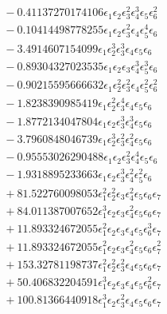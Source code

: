 \documentclass[10pt]{article}
\begin{document}
\begin{align*}
&{}  - 0.41137270174106 \epsilon_{1} \epsilon_{2} \epsilon_{3}^{2} \epsilon_{4}^{3} \epsilon_{5} \epsilon_{6}^{2} \\
&{}  - 0.10414498778255 \epsilon_{1} \epsilon_{2} \epsilon_{3}^{2} \epsilon_{4} \epsilon_{5}^{4} \epsilon_{6} \\
&{}  - 3.4914607154099 \epsilon_{1} \epsilon_{2}^{3} \epsilon_{3}^{3} \epsilon_{4} \epsilon_{5} \epsilon_{6} \\
&{}  - 0.89304327023535 \epsilon_{1} \epsilon_{2} \epsilon_{3} \epsilon_{4}^{3} \epsilon_{5}^{3} \epsilon_{6} \\
&{}  - 0.90215595666632 \epsilon_{1} \epsilon_{2}^{2} \epsilon_{3}^{2} \epsilon_{4} \epsilon_{5}^{2} \epsilon_{6}^{2} \\
&{}  - 1.8238390985419 \epsilon_{1} \epsilon_{2}^{2} \epsilon_{3}^{4} \epsilon_{4} \epsilon_{5} \epsilon_{6} \\
&{}  - 1.8772134047804 \epsilon_{1} \epsilon_{2} \epsilon_{3}^{3} \epsilon_{4}^{3} \epsilon_{5} \epsilon_{6} \\
&{}  - 3.7960848046739 \epsilon_{1} \epsilon_{2}^{3} \epsilon_{3}^{2} \epsilon_{4}^{2} \epsilon_{5} \epsilon_{6} \\
&{}  - 0.95553026290488 \epsilon_{1} \epsilon_{2} \epsilon_{3}^{2} \epsilon_{4}^{4} \epsilon_{5} \epsilon_{6} \\
&{}  - 1.9318895233663 \epsilon_{1} \epsilon_{2} \epsilon_{3}^{3} \epsilon_{4}^{2} \epsilon_{5}^{2} \epsilon_{6} \\
&{}  + 81.522760098053 \epsilon_{1}^{2} \epsilon_{2}^{2} \epsilon_{3} \epsilon_{4}^{2} \epsilon_{5} \epsilon_{6} \epsilon_{7} \\
&{}  + 84.011387007652 \epsilon_{1}^{3} \epsilon_{2} \epsilon_{3} \epsilon_{4}^{2} \epsilon_{5} \epsilon_{6} \epsilon_{7} \\
&{}  + 11.893324672055 \epsilon_{1}^{2} \epsilon_{2} \epsilon_{3} \epsilon_{4} \epsilon_{5} \epsilon_{6}^{3} \epsilon_{7} \\
&{}  + 11.893324672055 \epsilon_{1}^{2} \epsilon_{2} \epsilon_{3} \epsilon_{4}^{2} \epsilon_{5} \epsilon_{6} \epsilon_{7}^{2} \\
&{}  + 153.32781198737 \epsilon_{1}^{2} \epsilon_{2}^{2} \epsilon_{3}^{2} \epsilon_{4} \epsilon_{5} \epsilon_{6} \epsilon_{7} \\
&{}  + 50.406832204591 \epsilon_{1}^{3} \epsilon_{2} \epsilon_{3} \epsilon_{4} \epsilon_{5} \epsilon_{6}^{2} \epsilon_{7} \\
&{}  + 100.81366440918 \epsilon_{1}^{3} \epsilon_{2} \epsilon_{3}^{2} \epsilon_{4} \epsilon_{5} \epsilon_{6} \epsilon_{7} \\

\end{align*}
\end{document}
